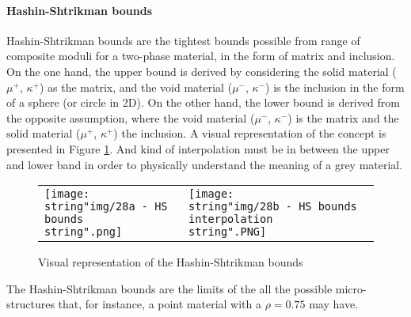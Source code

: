 \paragraph{Hashin-Shtrikman bounds}
Hashin-Shtrikman  bounds are the tightest bounds possible from range of composite moduli for a two-phase material, in the form of matrix and inclusion.
On the one hand, the upper bound is derived by considering the solid
material ($\mu^{+}$, $\kappa^{+}$) as the matrix, and the void material
($\mu^{-}$, $\kappa^{-}$) is the inclusion in the form of a sphere
(or circle in 2D). On the other hand, the lower bound is derived from
the opposite assumption, where the void material ($\mu^{-}$, $\kappa^{-}$)
is the matrix and the solid material ($\mu^{+}$, $\kappa^{+}$) the
inclusion. A visual representation of the concept is presented in
Figure \ref{fig:Visual-representation-of}. And kind of interpolation must be in between the upper and lower band in order to physically understand the meaning of a grey material.
\begin{figure}[H]
\begin{centering}
\begin{tabular}{>{\centering}m{7cm}>{\centering}m{7cm}}
\texttt{[image: \\string"img/28a - HS bounds\\string".png]} & \centering{}\texttt{[image: \\string"img/28b - HS bounds interpolation\\string".PNG]}\tabularnewline
\end{tabular}
\par\end{centering}
\caption{Visual representation of the Hashin-Shtrikman bounds\label{fig:Visual-representation-of}}
\end{figure}

The Hashin-Shtrikman bounds are the limits of the all the possible micro-structures that, for instance, a point material with a $ \rho=0.75 $ may have. 
